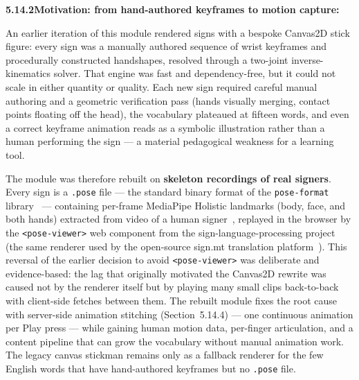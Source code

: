 \noindent\textbf{5.14.2\quad Motivation: from hand-authored keyframes to motion capture:}\par
{}
\vspace{0.2cm}

\noindent An earlier iteration of this module rendered signs with a bespoke Canvas2D stick figure: every sign was a manually authored sequence of wrist keyframes and procedurally constructed handshapes, resolved through a two-joint inverse-kinematics solver. That engine was fast and dependency-free, but it could not scale in either quantity or quality. Each new sign required careful manual authoring and a geometric verification pass (hands visually merging, contact points floating off the head), the vocabulary plateaued at fifteen words, and even a correct keyframe animation reads as a symbolic illustration rather than a human performing the sign --- a material pedagogical weakness for a learning tool.\par\vspace{0.2cm}

\noindent The module was therefore rebuilt on \textbf{skeleton recordings of real signers}. Every sign is a \texttt{.pose} file --- the standard binary format of the \texttt{pose-format} library~\cite{poseformat} --- containing per-frame MediaPipe Holistic landmarks (body, face, and both hands) extracted from video of a human signer~\cite{zhang2020mediapipe}, replayed in the browser by the \texttt{<pose-viewer>} web component from the sign-language-processing project (the same renderer used by the open-source sign.mt translation platform~\cite{signmt2023}). This reversal of the earlier decision to avoid \texttt{<pose-viewer>} was deliberate and evidence-based: the lag that originally motivated the Canvas2D rewrite was caused not by the renderer itself but by playing many small clips back-to-back with client-side fetches between them. The rebuilt module fixes the root cause with server-side animation stitching (Section~5.14.4) --- one continuous animation per Play press --- while gaining human motion data, per-finger articulation, and a content pipeline that can grow the vocabulary without manual animation work. The legacy canvas stickman remains only as a fallback renderer for the few English words that have hand-authored keyframes but no \texttt{.pose} file.\par\vspace{0.3cm}

